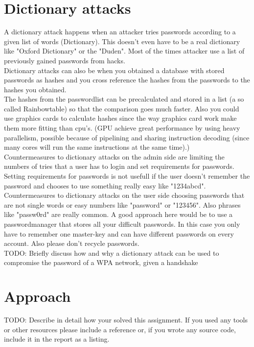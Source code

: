 \documentclass{scrartcl}
\newcommand\todo[1]{TODO: #1}
\begin{document}
\section*{Dictionary attacks}
A dictionary attack happens when an attacker tries passwords according to a given list of words (Dictionary). This doesn't even have to be a real dictionary like "Oxford Dictionary" or the "Duden". Most of the times attacker use a list of previously gained passwords from hacks. \\
Dictionary attacks can also be when you obtained a database with stored passwords as hashes and you cross reference the hashes from the passwords to the hashes you obtained.\\
The hashes from the passwordlist can be precalculated and stored in a list (a so called Rainbowtable) so that the comparison goes much faster. Also you could use graphics cards to calculate hashes since the way graphics card work make them more fitting than cpu's. (GPU achieve great performance by using heavy parallelism, possible because of pipelining and sharing instruction decoding (since many cores will run the same instructions at the same time).)\\
Countermeasures to dictionary attacks on the admin side are limiting the numbers of tries that a user has to login and set requirements for passwords. Setting requirements for passwords is not usefull if the user doesn't remember the password and chooses to use something really easy like "1234abcd".\\
Countermeasures to dictionary attacks on the user side choosing passwords that are not single words or easy numbers like "password" or "123456". Also phrases like "passw0rd" are really common. A good approach here would be to use a passwordmanager that stores all your difficult passwords. In this case you only have to remember one master-key and can have different passwords on every account. Also please don't recycle passwords.\\
\todo{Briefly discuss how and why a dictionary attack can be used to compromise
the password of a WPA network, given a handshake}

\section*{Approach}
\todo{Describe in detail how your solved this assignment. If you used any tools
or other resources please include a reference or, if you wrote any source code,
include it in the report as a listing.}
\end{document}
